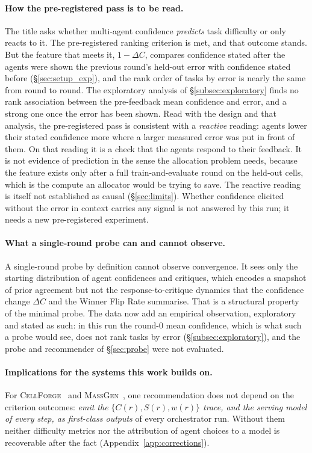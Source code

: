 \documentclass[10pt,a4paper]{article}
\begin{document}
\paragraph{How the pre-registered pass is to be read.} The title asks
whether multi-agent confidence \emph{predicts} task difficulty or only reacts to it. The
pre-registered ranking criterion is met, and that outcome stands. But the feature
that meets it, $1-\Delta C$, compares confidence stated after the agents were shown
the previous round's held-out error with confidence stated before
(\S\ref{sec:setup_exp}), and the rank order of tasks by error is nearly the same
from round to round. The exploratory analysis of \S\ref{subsec:exploratory} finds no
rank association between the pre-feedback mean confidence and error, and a strong one
once the error has been shown. Read with the design and that analysis, the
pre-registered pass is consistent with a \emph{reactive} reading: agents lower their
stated confidence more where a larger measured error was put in front of them. On
that reading it is a check that the agents respond to their feedback. It is not
evidence of prediction in the sense the allocation problem needs, because the feature
exists only after a full train-and-evaluate round on the held-out cells, which is the
compute an allocator would be trying to save. The reactive reading is itself not
established as causal (\S\ref{sec:limits}). Whether confidence elicited without
the error in context carries any signal is not answered by this run; it needs a
new pre-registered experiment.

\paragraph{What a single-round probe can and cannot observe.} A single-round
probe by definition cannot observe convergence. It sees only the starting
distribution of agent confidences and critiques, which encodes a snapshot of
prior agreement but not the response-to-critique dynamics that the confidence
change $\Delta C$ and the Winner Flip Rate summarise. That is a structural property of the minimal probe. The data now
add an empirical observation, exploratory and stated as such: in this run the
round-$0$ mean confidence, which is what such a probe would see, does not rank
tasks by error (\S\ref{subsec:exploratory}), and the probe and recommender of
\S\ref{sec:probe} were not evaluated.

\paragraph{Implications for the systems this work builds on.} For
\textsc{CellForge}~\citep{chen2025cellforge} and
\textsc{MassGen}~\citep{massgen2025github}, one recommendation does not depend
on the criterion outcomes: \emph{emit the $\{C(r), S(r), w(r)\}$ trace, and the
serving model of every step, as first-class outputs} of every orchestrator
run. Without them neither difficulty metrics nor the attribution of agent
choices to a model is recoverable after the fact (Appendix~\ref{app:corrections}).
\end{document}
